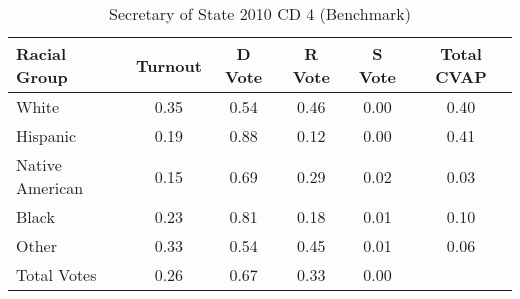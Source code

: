 \begin{table}[htb]
\begin{center}
\caption{Secretary of State 2010 CD 4 (Benchmark)}
\label{sos10_cvap_cd_4_benchmark}
\begin{tabular}{lccccc}
  \hline
Racial Group & Turnout & D Vote & R Vote & S Vote & Total CVAP \\ 
  \hline
White & 0.35 & 0.54 & 0.46 & 0.00 & 0.40 \\ 
  Hispanic & 0.19 & 0.88 & 0.12 & 0.00 & 0.41 \\ 
  Native American & 0.15 & 0.69 & 0.29 & 0.02 & 0.03 \\ 
  Black & 0.23 & 0.81 & 0.18 & 0.01 & 0.10 \\ 
  Other & 0.33 & 0.54 & 0.45 & 0.01 & 0.06 \\ 
  Total Votes & 0.26 & 0.67 & 0.33 & 0.00 &  \\ 
   \hline
\end{tabular}
\end{center}
\end{table}
